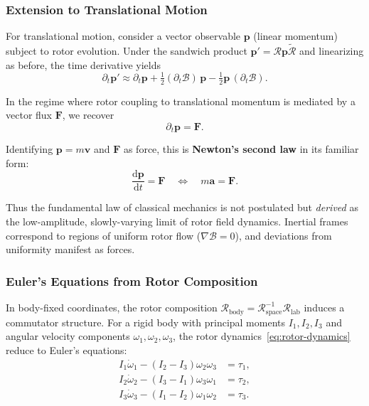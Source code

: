 \documentclass[11pt,a4paper]{article}
\newcommand{\rev}[1]{\widetilde{#1}}           %
\newcommand{\Rotor}{\mathcal{R}}
\newcommand{\Biv}{\mathcal{B}}
\newcommand{\D}{\nabla}                        %
\theoremstyle{definition}
\theoremstyle{plain}
\theoremstyle{remark}
\begin{document}
\subsubsection{Extension to Translational Motion}

For translational motion, consider a vector observable $\mathbf{p}$ (linear momentum) subject to rotor evolution. Under the sandwich product $\mathbf{p}' = \Rotor \mathbf{p} \rev{\Rotor}$ and linearizing as before, the time derivative yields
\begin{equation}
\partial_t \mathbf{p}' \approx \partial_t \mathbf{p} + \tfrac{1}{2}(\partial_t\Biv)\, \mathbf{p} - \tfrac{1}{2}\mathbf{p}\,(\partial_t\Biv).
\end{equation}

In the regime where rotor coupling to translational momentum is mediated by a vector flux $\mathbf{F}$, we recover
\begin{equation}
\partial_t \mathbf{p} = \mathbf{F}.
\label{eq:newton-translational}
\end{equation}

Identifying $\mathbf{p} = m\mathbf{v}$ and $\mathbf{F}$ as force, this is \textbf{Newton's second law} in its familiar form:
\begin{equation}
\boxed{\frac{\mathrm{d}\mathbf{p}}{\mathrm{d}t} = \mathbf{F} \quad \Longleftrightarrow \quad m\mathbf{a} = \mathbf{F}.}
\label{eq:newton-final}
\end{equation}

Thus the fundamental law of classical mechanics is not postulated but \emph{derived} as the low-amplitude, slowly-varying limit of rotor field dynamics. Inertial frames correspond to regions of uniform rotor flow ($\D\Biv = 0$), and deviations from uniformity manifest as forces.

\subsubsection{Euler's Equations from Rotor Composition}

In body-fixed coordinates, the rotor composition $\Rotor_{\text{body}} = \Rotor_{\text{space}}^{-1} \Rotor_{\text{lab}}$ induces a commutator structure. For a rigid body with principal moments $I_1, I_2, I_3$ and angular velocity components $\omega_1, \omega_2, \omega_3$, the rotor dynamics~\eqref{eq:rotor-dynamics} reduce to Euler's equations:
\begin{align}
I_1 \dot{\omega}_1 - (I_2 - I_3)\omega_2\omega_3 &= \tau_1, \\
I_2 \dot{\omega}_2 - (I_3 - I_1)\omega_3\omega_1 &= \tau_2, \\
I_3 \dot{\omega}_3 - (I_1 - I_2)\omega_1\omega_2 &= \tau_3.
\end{align}
\end{document}

